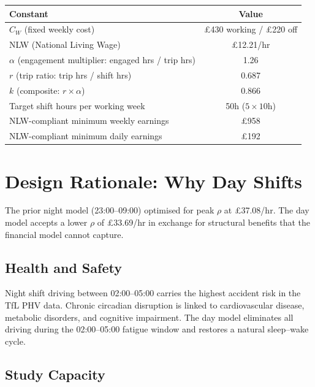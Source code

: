 \documentclass[a4paper,11pt]{article}
\begin{document}
\begin{tabularx}{\textwidth}{X C}
\toprule
\textbf{Constant} & \textbf{Value} \\
\midrule
$C_W$ (fixed weekly cost) & \pounds430 working / \pounds220 off \\
NLW (National Living Wage) & \pounds12.21/hr \\
$\alpha$ (engagement multiplier: engaged hrs / trip hrs) & 1.26 \\
$r$ (trip ratio: trip hrs / shift hrs) & 0.687 \\
$k$ (composite: $r \times \alpha$) & 0.866 \\
Target shift hours per working week & 50h ($5 \times 10$h) \\
NLW-compliant minimum weekly earnings & \pounds958 \\
NLW-compliant minimum daily earnings & \pounds192 \\
\bottomrule
\end{tabularx}

\newpage

\section{Design Rationale: Why Day Shifts}

The prior night model (23:00--09:00) optimised for peak $\rho$ at \pounds37.08/hr. The day model accepts a lower $\rho$ of \pounds33.69/hr in exchange for structural benefits that the financial model cannot capture.

\subsection{Health and Safety}

Night shift driving between 02:00--05:00 carries the highest accident risk in the TfL PHV data. Chronic circadian disruption is linked to cardiovascular disease, metabolic disorders, and cognitive impairment. The day model eliminates all driving during the 02:00--05:00 fatigue window and restores a natural sleep--wake cycle.

\subsection{Study Capacity}
\end{document}
